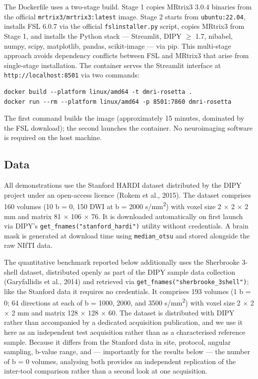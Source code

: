 \documentclass[12pt,a4paper]{article}
\begin{document}
The Dockerfile uses a two-stage build. Stage 1 copies MRtrix3 3.0.4 binaries from the official \texttt{mrtrix3/mrtrix3:latest} image. Stage 2 starts from \texttt{ubuntu:22.04}, installs FSL 6.0.7 via the official \texttt{fslinstaller.py} script, copies MRtrix3 from Stage 1, and installs the Python stack --- Streamlit, DIPY $\geq$ 1.7, nibabel, numpy, scipy, matplotlib, pandas, scikit-image --- via pip. This multi-stage approach avoids dependency conflicts between FSL and MRtrix3 that arise from single-stage installation. The container serves the Streamlit interface at \texttt{http://localhost:8501} via two commands:

\begin{verbatim}
docker build --platform linux/amd64 -t dmri-rosetta .
docker run --rm --platform linux/amd64 -p 8501:7860 dmri-rosetta
\end{verbatim}

The first command builds the image (approximately 15 minutes, dominated by the FSL download); the second launches the container. No neuroimaging software is required on the host machine.

\subsection{Data}\label{data}

All demonstrations use the Stanford HARDI dataset distributed by the DIPY project under an open-access licence (Rokem et al., 2015). The dataset comprises 160 volumes (10 b = 0, 150 DWI at b = 2000 s/mm\textsuperscript{2}) with voxel size 2 $\times$ 2 $\times$ 2 mm and matrix 81 $\times$ 106 $\times$ 76. It is downloaded automatically on first launch via DIPY's \texttt{get\_fnames("stanford\_hardi")} utility without credentials. A brain mask is generated at download time using \texttt{median\_otsu} and stored alongside the raw NIfTI data.

The quantitative benchmark reported below additionally uses the Sherbrooke 3-shell dataset, distributed openly as part of the DIPY sample data collection (Garyfallidis et al., 2014) and retrieved via \texttt{get\_fnames("sherbrooke\_3shell")}; like the Stanford data it requires no credentials. It comprises 193 volumes (1 b = 0; 64 directions at each of b = 1000, 2000, and 3500 s/mm\textsuperscript{2}) with voxel size 2 $\times$ 2 $\times$ 2 mm and matrix 128 $\times$ 128 $\times$ 60. The dataset is distributed with DIPY rather than accompanied by a dedicated acquisition publication, and we use it here as an independent test acquisition rather than as a characterised reference sample. Because it differs from the Stanford data in site, protocol, angular sampling, b-value range, and --- importantly for the results below --- the number of b = 0 volumes, analysing both provides an independent replication of the inter-tool comparison rather than a second look at one acquisition.
\end{document}
